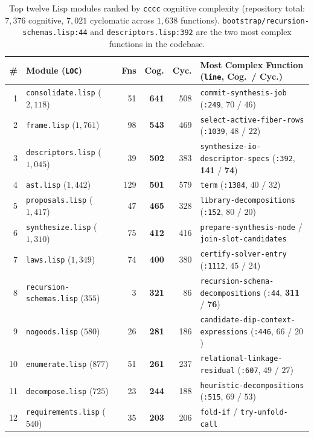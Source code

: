 \documentclass[12pt]{article}
\begin{document}
\begin{table}[htbp]
\centering
\footnotesize
\setlength{\tabcolsep}{5pt}
\begin{tabular}{@{}rlrrrL{6.8cm}@{}}
\toprule
\textbf{\#} & \textbf{Module (\texttt{LOC})} & \textbf{Fns} & \textbf{Cog.} & \textbf{Cyc.} & \textbf{Most Complex Function (\texttt{line}, Cog.\ / Cyc.)} \\
 & \texttt{consolidate.lisp} ($2,118$) & 51 & \textbf{641} & 508 & \texttt{commit-synthesis-job} (\texttt{:249}, $70$ / $46$) \\
2 & \texttt{frame.lisp} ($1,761$) & 98 & \textbf{543} & 469 & \texttt{select-active-fiber-rows} (\texttt{:1039}, $48$ / $22$) \\
3 & \texttt{descriptors.lisp} ($1,045$) & 39 & \textbf{502} & 383 & \texttt{synthesize-io-descriptor-specs} (\texttt{:392}, \textbf{141} / \textbf{74}) \\
4 & \texttt{ast.lisp} ($1,442$) & 129 & \textbf{501} & 579 & \texttt{term} (\texttt{:1384}, $40$ / $32$) \\
5 & \texttt{proposals.lisp} ($1,417$) & 47 & \textbf{465} & 328 & \texttt{library-decompositions} (\texttt{:152}, $80$ / $20$) \\
6 & \texttt{synthesize.lisp} ($1,310$) & 75 & \textbf{412} & 416 & \texttt{prepare-synthesis-node} / \texttt{join-slot-candidates} \\
7 & \texttt{laws.lisp} ($1,349$) & 74 & \textbf{400} & 380 & \texttt{certify-solver-entry} (\texttt{:1112}, $45$ / $24$) \\
8 & \texttt{recursion-schemas.lisp} ($355$) & 3 & \textbf{321} & 86 & \texttt{recursion-schema-decompositions} (\texttt{:44}, \textbf{311} / \textbf{76}) \\
9 & \texttt{nogoods.lisp} ($580$) & 26 & \textbf{281} & 186 & \texttt{candidate-dip-context-expressions} (\texttt{:446}, $66$ / $20$) \\
10 & \texttt{enumerate.lisp} ($877$) & 51 & \textbf{261} & 237 & \texttt{relational-linkage-residual} (\texttt{:607}, $49$ / $27$) \\
11 & \texttt{decompose.lisp} ($725$) & 23 & \textbf{244} & 188 & \texttt{heuristic-decompositions} (\texttt{:515}, $69$ / $53$) \\
12 & \texttt{requirements.lisp} ($540$) & 35 & \textbf{203} & 206 & \texttt{fold-if} / \texttt{try-unfold-call} \\
\bottomrule
\end{tabular}
\caption{Top twelve Lisp modules ranked by \texttt{cccc} cognitive complexity (repository total: $7,376$ cognitive, $7,021$ cyclomatic across $1,638$ functions). \texttt{bootstrap/recursion-schemas.lisp:44} and \texttt{descriptors.lisp:392} are the two most complex functions in the codebase.}
\label{tab:cccc}
\end{table}
\end{document}
